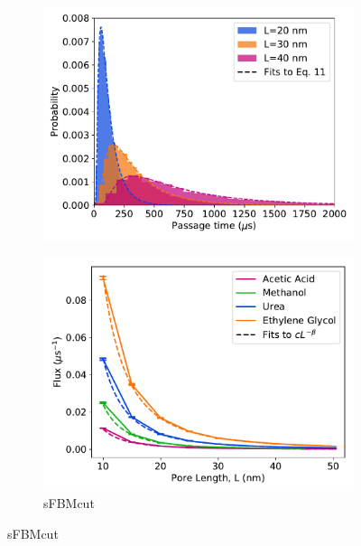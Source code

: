 \documentclass{article}
\begin{document}
  \begin{figure}
  \centering
  \begin{subfigure}{0.325\textwidth}
  \includegraphics[width=\textwidth]{fpt_distributions.pdf}
  \caption{}\label{fig:fpt_distributions}
  \end{subfigure}
  \begin{subfigure}{0.325\textwidth}
  \includegraphics[width=\textwidth]{flux_curves.pdf}
  \caption{sFBMcut}\label{fig:flux_curves_ad}

\end{subfigure}
\end{figure}
\end{document}
